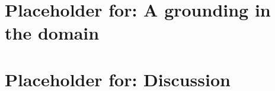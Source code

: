 \documentclass[
	a4paper, %
	fontsize=10pt, %
	twoside=true, %
	numbers=noenddot, %
]{kaobook}
\begin{document}



\chapter{Placeholder for: A grounding in the domain}\label{chapter-preparing-the-ground}%
%






%
\chapter{Placeholder for: Discussion}
%

\clearpage


\appendix %






\backmatter %

\end{document}
